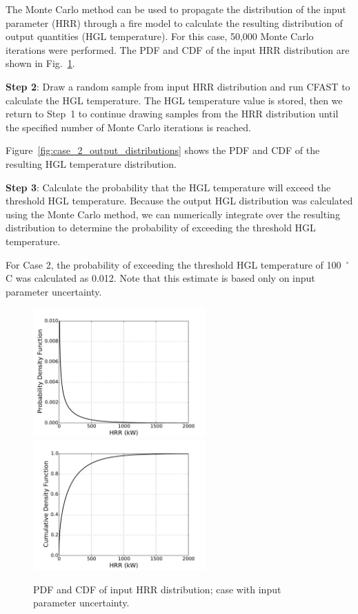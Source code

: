 \documentclass[12pt]{article}
\begin{document}
The Monte Carlo method can be used to propagate the distribution of the input parameter (HRR) through a fire model to calculate the resulting distribution of output quantities (HGL temperature). For this case, 50,000 Monte Carlo iterations were performed. The PDF and CDF of the input HRR distribution are shown in Fig.~\ref{fig:case_2_input_distributions}.

\textbf{Step 2}: Draw a random sample from input HRR distribution and run CFAST to calculate the HGL temperature. The HGL temperature value is stored, then we return to Step~1 to continue drawing samples from the HRR distribution until the specified number of Monte Carlo iterations is reached.

Figure~\ref{fig:case_2_output_distributions} shows the PDF and CDF of the resulting HGL temperature distribution.

\textbf{Step 3}: Calculate the probability that the HGL temperature will exceed the threshold HGL temperature. Because the output HGL distribution was calculated using the Monte Carlo method, we can numerically integrate over the resulting distribution to determine the probability of exceeding the threshold HGL temperature.

For Case 2, the probability of exceeding the threshold HGL temperature of 100~$^\circ$C was calculated as 0.012. Note that this estimate is based only on input parameter uncertainty.


\clearpage


\begin{figure}[p]
\includegraphics[width=2.6in]{Figures/input_PDF}
\includegraphics[width=2.6in]{Figures/input_CDF}
\caption{PDF and CDF of input HRR distribution; case with input parameter uncertainty.}
\label{fig:case_2_input_distributions}
\end{figure}
\end{document}
